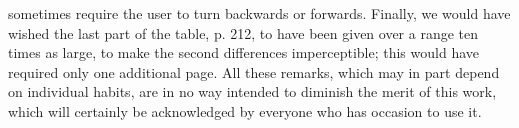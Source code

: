 sometimes require the user to turn backwards or forwards. Finally, we would have wished the last part of the table, p. 212, to have been given over a range ten times as large, to make the second differences imperceptible; this would have required  only one additional page. All these remarks, which may in part depend on individual habits, are in no way intended to diminish the merit of this work, which will certainly be acknowledged by everyone who has occasion to use it.

